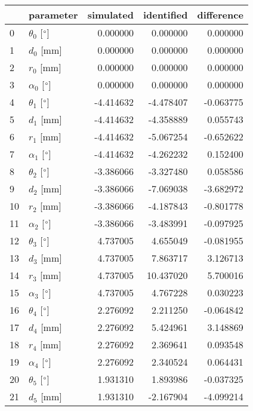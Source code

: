 \documentclass{standalone}%
\begin{document}
%
\normalsize%
\begin{tabular}{llrrr}
\toprule
{} &                 parameter & simulated & identified & difference \\
\midrule
0  &  $\theta_{0}$ [$\degree$] &  0.000000 &   0.000000 &   0.000000 \\
1  &              $d_{0}$ [mm] &  0.000000 &   0.000000 &   0.000000 \\
2  &              $r_{0}$ [mm] &  0.000000 &   0.000000 &   0.000000 \\
3  &  $\alpha_{0}$ [$\degree$] &  0.000000 &   0.000000 &   0.000000 \\
4  &  $\theta_{1}$ [$\degree$] & -4.414632 &  -4.478407 &  -0.063775 \\
5  &              $d_{1}$ [mm] & -4.414632 &  -4.358889 &   0.055743 \\
6  &              $r_{1}$ [mm] & -4.414632 &  -5.067254 &  -0.652622 \\
7  &  $\alpha_{1}$ [$\degree$] & -4.414632 &  -4.262232 &   0.152400 \\
8  &  $\theta_{2}$ [$\degree$] & -3.386066 &  -3.327480 &   0.058586 \\
9  &              $d_{2}$ [mm] & -3.386066 &  -7.069038 &  -3.682972 \\
10 &              $r_{2}$ [mm] & -3.386066 &  -4.187843 &  -0.801778 \\
11 &  $\alpha_{2}$ [$\degree$] & -3.386066 &  -3.483991 &  -0.097925 \\
12 &  $\theta_{3}$ [$\degree$] &  4.737005 &   4.655049 &  -0.081955 \\
13 &              $d_{3}$ [mm] &  4.737005 &   7.863717 &   3.126713 \\
14 &              $r_{3}$ [mm] &  4.737005 &  10.437020 &   5.700016 \\
15 &  $\alpha_{3}$ [$\degree$] &  4.737005 &   4.767228 &   0.030223 \\
16 &  $\theta_{4}$ [$\degree$] &  2.276092 &   2.211250 &  -0.064842 \\
17 &              $d_{4}$ [mm] &  2.276092 &   5.424961 &   3.148869 \\
18 &              $r_{4}$ [mm] &  2.276092 &   2.369641 &   0.093548 \\
19 &  $\alpha_{4}$ [$\degree$] &  2.276092 &   2.340524 &   0.064431 \\
20 &  $\theta_{5}$ [$\degree$] &  1.931310 &   1.893986 &  -0.037325 \\
21 &              $d_{5}$ [mm] &  1.931310 &  -2.167904 &  -4.099214 \\

\end{tabular}
\end{document}
